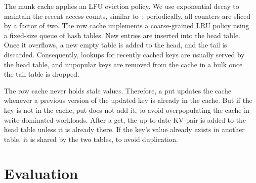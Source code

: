 \documentclass[sigplan,10pt]{acmart}
\newcommand{\inred}[1]{{\color{red}{#1}}}
\newcommand{\remove}[1]{}
\newcommand{\sys}{EvenDB}
\begin{document}
The munk cache applies an LFU eviction policy. %
We use exponential decay to maintain the recent access counts, similar to~\cite{tinyLFU}: periodically, all counters are 
sliced by a factor of two. 
The row cache implements a coarse-grained LRU policy using a fixed-size queue of hash tables. 
New entries are inserted into the head table. Once it overflows, a new empty table is added to the head,
and the tail is discarded. Consequently, lookups for recently cached keys are usually served by the head 
table, and unpopular keys are removed from the cache in a bulk once the tail table is dropped.

The row cache  never holds stale values. %
Therefore, a put updates the cache  whenever a previous version of the updated key is already in the cache. 
But if the key is not in the cache, put does not add it, to avoid overpopulating the cache 
in write-dominated workloads. After a get, the up-to-date KV-pair is added to the head table unless it is already there.
If the key's value already exists in another table, it is shared by the two tables, to avoid duplication.

\remove{
\paragraph{Chunk merges support.}
Our current implementation does not support chunk merges (to defragment the store after massive data deletion). This could be done as 
part of the rebalance procedure (see~\cite{kiwi}).
In \sys\ this entails merging the funks of two chunks. As in the split operation, the rebalance first acquires the  rebalance locks of the chunks to be merged---to ensure exclusiveness. The content of the chunks is merged and written into a new chunk. Finally, the rebalance acquires the chunks' locks for the short period in which the content that was added to the chunks during the merge is written to the log of the new chunk, and the new chunk swaps the old chunks in the list.
}

\section{Evaluation}
\label{sec:eval}
\end{document}
